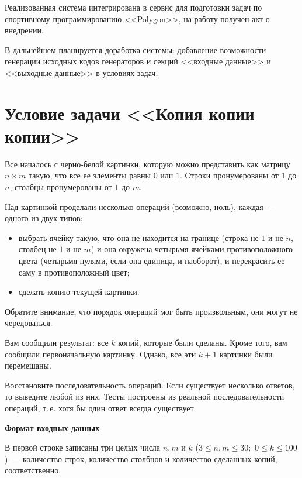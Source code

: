 \documentclass[times,specification,annotation]{style/itmo-student-thesis/itmo-student-thesis}
\begin{document}
Реализованная система интегрирована в сервис для подготовки задач по спортивному программированию <<Polygon>>, на работу получен акт о внедрении.

В дальнейшем планируется доработка системы: добавление возможности генерации исходных кодов генераторов и секций <<входные данные>> и <<выходные данные>> в условиях задач.

\printmainbibliography

\appendix

\chapter{Условие задачи <<Копия копии копии>>}\label{statement1772F}


Все началось с черно-белой картинки, которую можно представить как матрицу $n \times m$ такую, что все ее элементы равны $0$ или $1$. Строки пронумерованы от $1$ до $n$, столбцы пронумерованы от $1$ до $m$.

Над картинкой проделали несколько операций (возможно, ноль), каждая~--- одного из двух типов:
\begin{itemize}[leftmargin=1.75cm]
\item выбрать ячейку такую, что она не находится на границе (строка не $1$ и не $n$, столбец не $1$ и не $m$) и она окружена четырьмя ячейками противоположного цвета (четырьмя нулями, если она единица, и наоборот), и перекрасить ее саму в противоположный цвет;
\item сделать копию текущей картинки.
\end{itemize}

Обратите внимание, что порядок операций мог быть произвольным, они могут не чередоваться.

Вам сообщили результат: все $k$ копий, которые были сделаны. Кроме того, вам сообщили первоначальную картинку. Однако, все эти $k+1$ картинки были перемешаны.

Восстановите последовательность операций. Если существует несколько ответов, то выведите любой из них. Тесты построены из реальной последовательности операций, т.\,е. хотя бы один ответ всегда существует.


\textbf{Формат входных данных}

В первой строке записаны три целых числа $n, m$ и $k$ ($3 \le n, m \le 30$;~$0 \le k \le 100$)~--- количество строк, количество столбцов и количество сделанных копий, соответственно.
\end{document}

